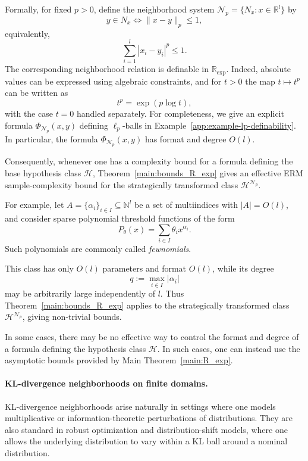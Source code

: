 \documentclass[11pt]{article}
\theoremstyle{plain}
\theoremstyle{definition}
\theoremstyle{remark}
\newcommand{\R}{\mathbb{R}}
\newcommand{\N}{\mathbb{N}}
\begin{document}
Formally, for fixed \(p>0\), define the neighborhood system
\(\mathcal N_p=\{N_x:x\in\R^l\}\) by
\[
  y\in N_x
  \iff
  \|x-y\|_p \le 1,
\]
equivalently,
\[
  \sum_{i=1}^l |x_i-y_i|^p \le 1.
\]
The corresponding neighborhood relation is definable in \(\R_{\exp}\). Indeed,
absolute values can be expressed using algebraic constraints, and for \(t>0\)
the map \(t\mapsto t^p\) can be written as
\[
  t^p=\exp(p\log t),
\]
with the case \(t=0\) handled separately. For completeness, we give an explicit
formula \(\Phi_{\mathcal N_p}(x,y)\) defining \(\ell_p\)-balls in
Example~\ref{app:example-lp-definability}. In particular, the formula
\(\Phi_{\mathcal N_p}(x,y)\) has format and degree \(O(l)\).

Consequently, whenever one has a complexity bound for a formula defining the
base hypothesis class \(\mathcal H\), Theorem~\ref{main:bounds_R_exp} gives an
effective ERM sample-complexity bound for the strategically transformed class
\(\mathcal H^{\mathcal N_p}\).

For example, let
\(A=\{\alpha_i\}_{i\in I}\subseteq \N^l\) be a set of multiindices with
\(|A|=O(l)\), and consider sparse polynomial threshold functions of the form
\[
  P_\theta(x)=\sum_{i\in I}\theta_i x^{\alpha_i}.
\]
Such polynomials are commonly called \emph{fewnomials}.

This class has only \(O(l)\) parameters and format \(O(l)\), while its degree
\[
q:=\max_{i\in I}|\alpha_i|
\]
may be arbitrarily large independently of \(l\). Thus
Theorem~\ref{main:bounds_R_exp} applies to the strategically transformed class
\(\mathcal H^{\mathcal N_p}\), giving non-trivial bounds.

In some cases, there may be no effective way to control the format and degree
of a formula defining the hypothesis class \(\mathcal H\). In such cases, one
can instead use the asymptotic bounds provided by
Main Theorem~\ref{main:R_exp}.

\paragraph{KL-divergence neighborhoods on finite domains.}

KL-divergence neighborhoods arise naturally in settings where one models
multiplicative or information-theoretic perturbations of distributions. They
are also standard in robust optimization and distribution-shift models, where
one allows the underlying distribution to vary within a KL ball around a
nominal distribution.
\end{document}
